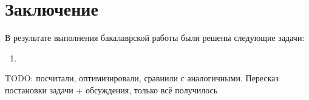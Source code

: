 \chapter{Заключение}

В результате выполнения бакалаврской работы были решены следующие задачи:

\begin{enumerate}[label=\arabic*)]
	\item 
\end{enumerate}

TODO: посчитали, оптимизировали, сравнили с аналогичными. Пересказ постановки задачи + обсуждения, только всё получилось